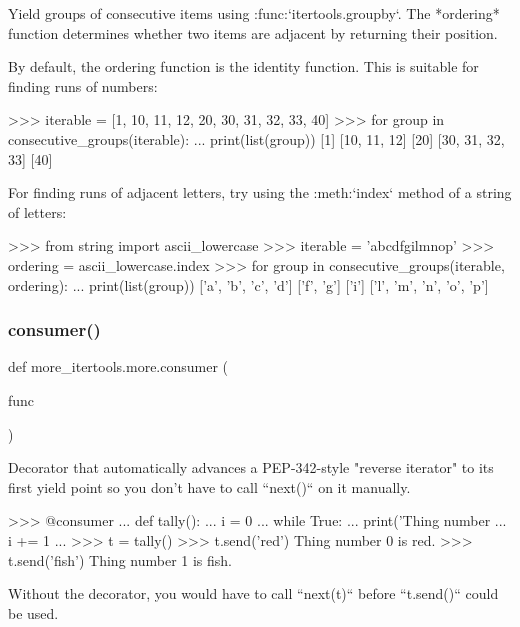 \begin{DoxyVerb}Yield groups of consecutive items using :func:`itertools.groupby`.
The *ordering* function determines whether two items are adjacent by
returning their position.

By default, the ordering function is the identity function. This is
suitable for finding runs of numbers:

    >>> iterable = [1, 10, 11, 12, 20, 30, 31, 32, 33, 40]
    >>> for group in consecutive_groups(iterable):
    ...     print(list(group))
    [1]
    [10, 11, 12]
    [20]
    [30, 31, 32, 33]
    [40]

For finding runs of adjacent letters, try using the :meth:`index` method
of a string of letters:

    >>> from string import ascii_lowercase
    >>> iterable = 'abcdfgilmnop'
    >>> ordering = ascii_lowercase.index
    >>> for group in consecutive_groups(iterable, ordering):
    ...     print(list(group))
    ['a', 'b', 'c', 'd']
    ['f', 'g']
    ['i']
    ['l', 'm', 'n', 'o', 'p']\end{DoxyVerb}
 \mbox{\label{namespacemore__itertools_1_1more_a52fff63ce0cd61f83bba85e17fc8bd32}} 
\subsubsection{\texorpdfstring{consumer()}{consumer()}}
{\footnotesize\ttfamily def more\+\_\+itertools.\+more.\+consumer (\begin{DoxyParamCaption}\item[{}]{func }\end{DoxyParamCaption})}

\begin{DoxyVerb}Decorator that automatically advances a PEP-342-style "reverse iterator"
to its first yield point so you don't have to call ``next()`` on it
manually.

    >>> @consumer
    ... def tally():
    ...     i = 0
    ...     while True:
    ...         print('Thing number %
    ...         i += 1
    ...
    >>> t = tally()
    >>> t.send('red')
    Thing number 0 is red.
    >>> t.send('fish')
    Thing number 1 is fish.

Without the decorator, you would have to call ``next(t)`` before
``t.send()`` could be used.\end{DoxyVerb}
 \mbox{\label{namespacemore__itertools_1_1more_a5eb1ee45109d68efd9ac8101205751bb}} 
